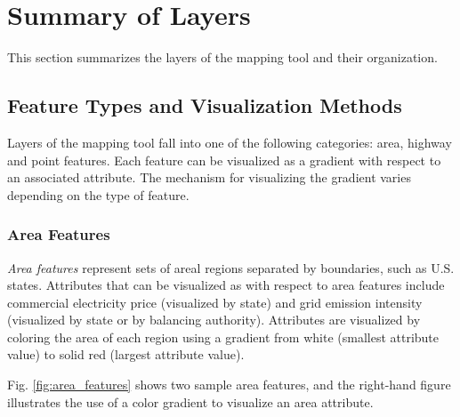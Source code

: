\section{Summary of Layers}
\label{sec:layers}
This section summarizes the layers of the mapping tool and their organization. 

\subsection{Feature Types and Visualization Methods}

Layers of the mapping tool fall into one of the following categories: area, highway and point features. Each feature can be visualized as a gradient with respect to an associated attribute. The mechanism for visualizing the gradient varies depending on the type of feature.

\subsubsection{Area Features}
\textit{Area features} represent sets of areal regions separated by boundaries, such as U.S. states. Attributes that can be visualized as with respect to area features include commercial electricity price (visualized by state) and grid emission intensity (visualized by state or by balancing authority). Attributes are visualized by coloring the area of each region using a gradient from white (smallest attribute value) to solid red (largest attribute value). 

Fig. \ref{fig:area_features} shows two sample area features, and the right-hand figure illustrates the use of a color gradient to visualize an area attribute. 

